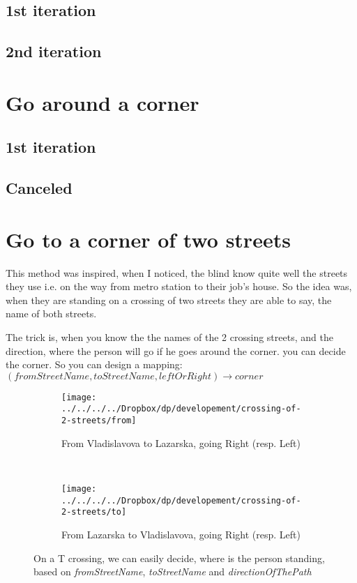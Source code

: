			\subsection{1st iteration}
			\subsection{2nd iteration}
		\section{Go around a corner}
			\subsection{1st iteration}
			\subsection{Canceled}
		\section{Go to a corner of two streets}
			This method was inspired, when I noticed, the blind know quite well the streets they use i.e. on the way from metro station to their job's house.
			So the idea was, when they are standing on a crossing of two streets they are able to say, the name of both streets.
			
			The trick is, when you know the the names of the 2 crossing streets, and the direction, where the person will go if he goes around the corner. you can decide the corner. So you can design a mapping: $(fromStreetName, toStreetName, leftOrRight) \rightarrow corner$
			
			\begin{figure*}[ht]
				\centering
				\begin{subfigure}[t]{0.45\textwidth}
					\centering
					\texttt{[image: ../../../../Dropbox/dp/developement/crossing-of-2-streets/from]}
					\caption[]{From Vladislavova to Lazarska, going Right (resp. Left)}
					\label{fig:x}
				\end{subfigure}%
				~ 
				\begin{subfigure}[t]{0.45\textwidth}
					\centering
					\texttt{[image: ../../../../Dropbox/dp/developement/crossing-of-2-streets/to]}
					\caption[]{From Lazarska to Vladislavova, going Right (resp. Left)}
					\label{fig:2-x-unique}
				\end{subfigure}
				
				\caption{On a T crossing, we can easily decide, where is the person standing, based on \emph{fromStreetName}, \emph{toStreetName} and \emph{directionOfThePath}}
			\end{figure*}
		
